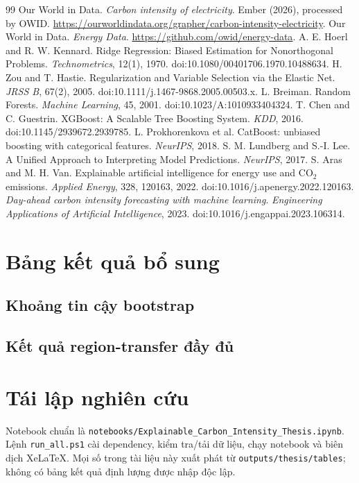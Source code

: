 \documentclass[12pt,a4paper,oneside]{report}
\begin{document}
\begin{thebibliography}{99}
 Our World in Data. \textit{Carbon intensity of electricity}. Ember (2026), processed by OWID. \url{https://ourworldindata.org/grapher/carbon-intensity-electricity}.
 Our World in Data. \textit{Energy Data}. \url{https://github.com/owid/energy-data}.
 A. E. Hoerl and R. W. Kennard. Ridge Regression: Biased Estimation for Nonorthogonal Problems. \textit{Technometrics}, 12(1), 1970. doi:10.1080/00401706.1970.10488634.
 H. Zou and T. Hastie. Regularization and Variable Selection via the Elastic Net. \textit{JRSS B}, 67(2), 2005. doi:10.1111/j.1467-9868.2005.00503.x.
 L. Breiman. Random Forests. \textit{Machine Learning}, 45, 2001. doi:10.1023/A:1010933404324.
 T. Chen and C. Guestrin. XGBoost: A Scalable Tree Boosting System. \textit{KDD}, 2016. doi:10.1145/2939672.2939785.
 L. Prokhorenkova et al. CatBoost: unbiased boosting with categorical features. \textit{NeurIPS}, 2018.
 S. M. Lundberg and S.-I. Lee. A Unified Approach to Interpreting Model Predictions. \textit{NeurIPS}, 2017.
 S. Aras and M. H. Van. Explainable artificial intelligence for energy use and CO$_2$ emissions. \textit{Applied Energy}, 328, 120163, 2022. doi:10.1016/j.apenergy.2022.120163.
 \textit{Day-ahead carbon intensity forecasting with machine learning}. \textit{Engineering Applications of Artificial Intelligence}, 2023. doi:10.1016/j.engappai.2023.106314.
\end{thebibliography}

\appendix
\chapter{Bảng kết quả bổ sung}
\section{Khoảng tin cậy bootstrap}


\section{Kết quả region-transfer đầy đủ}
\small

\normalsize

\chapter{Tái lập nghiên cứu}
Notebook chuẩn là \texttt{notebooks/Explainable\_Carbon\_Intensity\_Thesis.ipynb}. Lệnh \texttt{run\_all.ps1} cài dependency, kiểm tra/tải dữ liệu, chạy notebook và biên dịch XeLaTeX. Mọi số trong tài liệu này xuất phát từ \texttt{outputs/thesis/tables}; không có bảng kết quả định lượng được nhập độc lập.
\end{document}
